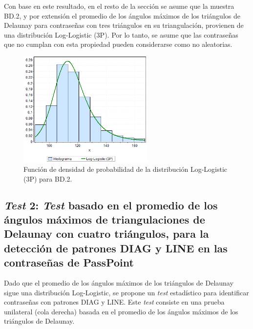 \documentclass[12pt]{report}
\begin{document}
Con base en este resultado, en el resto de la sección se asume que la muestra BD.2, y por extensión el promedio de los ángulos máximos de los triángulos de Delaunay para contraseñas con tres triángulos en su triangulación, provienen de una distribución Log-Logistic (3P). Por lo tanto, se asume que las contraseñas que no cumplan con esta propiedad pueden considerarse como no aleatorias.
 
\begin{figure}[ht]
	\centering
	
	\includegraphics[width=0.6\textwidth]{4td_fdp.png}
	\caption{Función de densidad de probabilidad de la  distribución Log-Logistic (3P) para BD.2.}
	\label{4TD_FDP}
\end{figure}
\newpage

\subsection{\textit{Test} 2: \textit{Test} basado en el promedio de los ángulos máximos de triangulaciones de Delaunay con cuatro triángulos, para la detección de patrones DIAG y LINE en las contraseñas de PassPoint}
\label{sec:2.2}

Dado que el promedio de los ángulos máximos de los triángulos de Delaunay sigue una distribución Log-Logistic, se propone un \textit{test} estadístico para identificar contraseñas con patrones DIAG y LINE. Este \textit{test} consiste en una prueba unilateral (cola derecha) basada en el promedio de los ángulos máximos de los triángulos de Delaunay.
\end{document}
